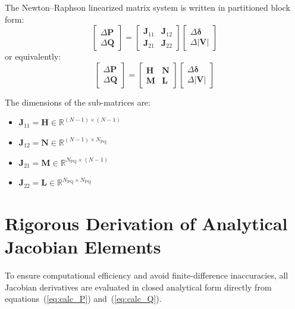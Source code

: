\documentclass[12pt,a4paper,oneside]{report}
\begin{document}
The Newton--Raphson linearized matrix system is written in partitioned block form:
\begin{equation}
\begin{bmatrix}
\Delta \mathbf{P} \\
\Delta \mathbf{Q}
\end{bmatrix}
=
\begin{bmatrix}
\mathbf{J}_{11} & \mathbf{J}_{12} \\
\mathbf{J}_{21} & \mathbf{J}_{22}
\end{bmatrix}
\begin{bmatrix}
\Delta \boldsymbol{\delta} \\
\Delta |\mathbf{V}|
\end{bmatrix}
\label{eq:nr_system}
\end{equation}
or equivalently:
\begin{equation}
\begin{bmatrix}
\Delta \mathbf{P} \\
\Delta \mathbf{Q}
\end{bmatrix}
=
\begin{bmatrix}
\mathbf{H} & \mathbf{N} \\
\mathbf{M} & \mathbf{L}
\end{bmatrix}
\begin{bmatrix}
\Delta \boldsymbol{\delta} \\
\Delta |\mathbf{V}|
\end{bmatrix}
\end{equation}

The dimensions of the sub-matrices are:
\begin{itemize}
    \item $\mathbf{J}_{11} = \mathbf{H} \in \mathbb{R}^{(N-1) \times (N-1)}$
    \item $\mathbf{J}_{12} = \mathbf{N} \in \mathbb{R}^{(N-1) \times N_{\text{PQ}}}$
    \item $\mathbf{J}_{21} = \mathbf{M} \in \mathbb{R}^{N_{\text{PQ}} \times (N-1)}$
    \item $\mathbf{J}_{22} = \mathbf{L} \in \mathbb{R}^{N_{\text{PQ}} \times N_{\text{PQ}}}$
\end{itemize}

\section{Rigorous Derivation of Analytical Jacobian Elements}
To ensure computational efficiency and avoid finite-difference inaccuracies, all Jacobian derivatives are evaluated in closed analytical form directly from equations~(\ref{eq:calc_P}) and~(\ref{eq:calc_Q}).
\end{document}
